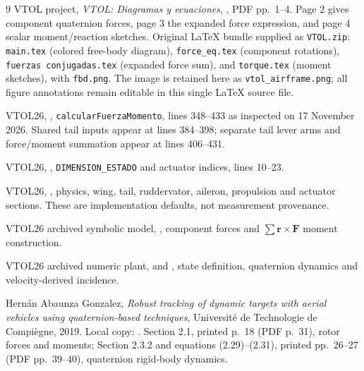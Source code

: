 \documentclass[11pt,a4paper]{article}
\numberwithin{equation}{section}
\newcommand{\vect}[1]{\boldsymbol{#1}}
\begin{document}
\clearpage
\begin{thebibliography}{9}
VTOL project, \emph{VTOL: Diagramas y ecuaciones},
, PDF pp.~1--4.
Page 2 gives component quaternion forces, page 3 the expanded force expression,
and page 4 scalar moment/reaction sketches.
Original LaTeX bundle supplied as \texttt{VTOL.zip}:
\texttt{main.tex} (colored free-body diagram), \texttt{force\_eq.tex}
(component rotations), \texttt{fuerzas conjugadas.tex} (expanded force sum),
and \texttt{torque.tex} (moment sketches), with \texttt{fbd.png}.
The image is retained here as \texttt{vtol\_airframe.png}; all figure annotations
remain editable in this single LaTeX source file.

VTOL26, ,
\texttt{calcularFuerzaMomento}, lines 348--433 as inspected on
17 November 2026. Shared tail inputs appear at lines 384--398; separate
tail lever arms and force/moment summation appear at lines 406--431.

VTOL26, ,
\texttt{DIMENSION\_ESTADO} and actuator indices, lines 10--23.

VTOL26, ,
physics, wing, tail, ruddervator, aileron, propulsion and actuator sections.
These are implementation defaults, not measurement provenance.

VTOL26 archived symbolic model,
,
component forces and $\sum\vect r\times\vect F$ moment construction.

VTOL26 archived numeric plant,
 and
,
state definition, quaternion dynamics and velocity-derived incidence.

Hern\'an Abaunza Gonzalez,
\emph{Robust tracking of dynamic targets with aerial vehicles using
quaternion-based techniques}, Universit\'e de Technologie de Compi\`egne,
2019. Local copy:
.
Section 2.1, printed p.~18 (PDF p.~31), rotor forces and moments;
Section 2.3.2 and equations (2.29)--(2.31), printed pp.~26--27
(PDF pp.~39--40), quaternion rigid-body dynamics.
\end{thebibliography}
\end{document}
